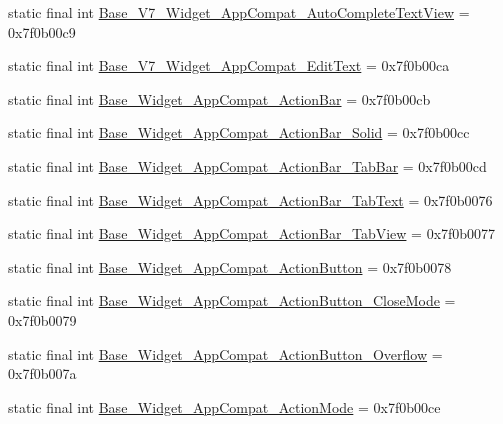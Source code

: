 \begin{CompactItemize}
\item 
static final int \hyperlink{classandroid_1_1support_1_1v7_1_1recyclerview_1_1_r_1_1style_10bf2aa5353f90e9afa04b5ac49571e8}{Base\_\-V7\_\-Widget\_\-AppCompat\_\-AutoCompleteTextView} = 0x7f0b00c9
\item 
static final int \hyperlink{classandroid_1_1support_1_1v7_1_1recyclerview_1_1_r_1_1style_2d708268c5aca785329051627105f62c}{Base\_\-V7\_\-Widget\_\-AppCompat\_\-EditText} = 0x7f0b00ca
\item 
static final int \hyperlink{classandroid_1_1support_1_1v7_1_1recyclerview_1_1_r_1_1style_9758797388b05db24c039bfedad12972}{Base\_\-Widget\_\-AppCompat\_\-ActionBar} = 0x7f0b00cb
\item 
static final int \hyperlink{classandroid_1_1support_1_1v7_1_1recyclerview_1_1_r_1_1style_5efd7cbbdb8094b6da1e3b7080c9250e}{Base\_\-Widget\_\-AppCompat\_\-ActionBar\_\-Solid} = 0x7f0b00cc
\item 
static final int \hyperlink{classandroid_1_1support_1_1v7_1_1recyclerview_1_1_r_1_1style_8b5593b0fcfd17f07255a1a56b502555}{Base\_\-Widget\_\-AppCompat\_\-ActionBar\_\-TabBar} = 0x7f0b00cd
\item 
static final int \hyperlink{classandroid_1_1support_1_1v7_1_1recyclerview_1_1_r_1_1style_5391bccc8a3d22a00156b2e231db2821}{Base\_\-Widget\_\-AppCompat\_\-ActionBar\_\-TabText} = 0x7f0b0076
\item 
static final int \hyperlink{classandroid_1_1support_1_1v7_1_1recyclerview_1_1_r_1_1style_db6326ca38219297274a2b23d3764737}{Base\_\-Widget\_\-AppCompat\_\-ActionBar\_\-TabView} = 0x7f0b0077
\item 
static final int \hyperlink{classandroid_1_1support_1_1v7_1_1recyclerview_1_1_r_1_1style_0acd65126c6f83ca8089100465bd08ff}{Base\_\-Widget\_\-AppCompat\_\-ActionButton} = 0x7f0b0078
\item 
static final int \hyperlink{classandroid_1_1support_1_1v7_1_1recyclerview_1_1_r_1_1style_00f510239bdf0688a73a525035d350e6}{Base\_\-Widget\_\-AppCompat\_\-ActionButton\_\-CloseMode} = 0x7f0b0079
\item 
static final int \hyperlink{classandroid_1_1support_1_1v7_1_1recyclerview_1_1_r_1_1style_2b845b30d2b14ea0181ab887a6ae7143}{Base\_\-Widget\_\-AppCompat\_\-ActionButton\_\-Overflow} = 0x7f0b007a
\item 
static final int \hyperlink{classandroid_1_1support_1_1v7_1_1recyclerview_1_1_r_1_1style_d8cd5a3fe71ce85a317a9050e14762db}{Base\_\-Widget\_\-AppCompat\_\-ActionMode} = 0x7f0b00ce
\item 

\end{CompactItemize}
